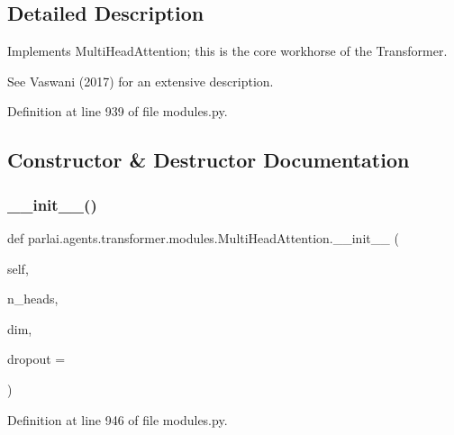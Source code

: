\subsection{Detailed Description}
\begin{DoxyVerb}Implements MultiHeadAttention; this is the core workhorse of the Transformer.

See Vaswani (2017) for an extensive description.
\end{DoxyVerb}
 

Definition at line 939 of file modules.\+py.



\subsection{Constructor \& Destructor Documentation}
\mbox{\label{classparlai_1_1agents_1_1transformer_1_1modules_1_1MultiHeadAttention_a427b8cfaac6d37141555616d9cee8b74}} 
\subsubsection{\texorpdfstring{\+\_\+\+\_\+init\+\_\+\+\_\+()}{\_\_init\_\_()}}
{\footnotesize\ttfamily def parlai.\+agents.\+transformer.\+modules.\+Multi\+Head\+Attention.\+\_\+\+\_\+init\+\_\+\+\_\+ (\begin{DoxyParamCaption}\item[{}]{self,  }\item[{}]{n\+\_\+heads,  }\item[{}]{dim,  }\item[{}]{dropout = {} }\end{DoxyParamCaption})}



Definition at line 946 of file modules.\+py.


